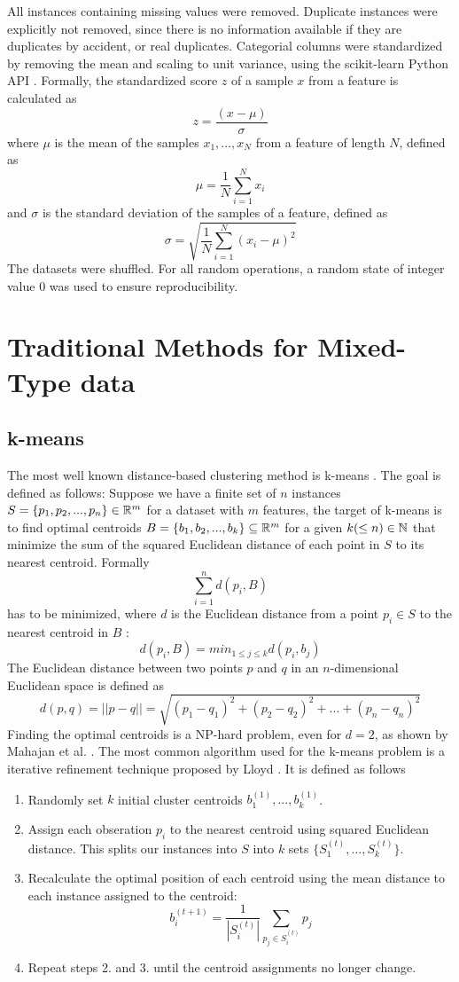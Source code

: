 All instances containing missing values were removed. Duplicate instances were explicitly not removed, since there is no information available if they are duplicates by accident, or real duplicates. Categorial columns were standardized by removing the mean and scaling to unit variance, using the scikit-learn Python API \cite{scikit_learn}. Formally, the standardized score $z$ of a sample $x$ from a feature is calculated as
$$z = \frac{(x-\mu)}{\sigma}$$
where $\mu$ is the mean of the samples $x_1, ...,x_N$ from a feature of length $N$, defined as
$$\mu = \frac{1}{N} \sum^{N}_{i=1} x_i$$
and $\sigma$ is the standard deviation of the samples of a feature, defined as
$$\sigma = \sqrt{\frac{1}{N} \sum^{N}_{i=1}(x_i - \mu)^2}$$
The datasets were shuffled. For all random operations, a random state of integer value 0 was used to ensure reproducibility.

\section{Traditional Methods for Mixed-Type data}

\subsection{k-means}

The most well known distance-based clustering method is k-means \cite{kmeans}. The goal is defined as follows: Suppose we have a finite set of $n$ instances $S=\{p_1, p_2, ..., p_n\} \in \mathbb{R}^m$ for a dataset with $m$ features, the target of k-means is to find optimal centroids $B=\{b_1, b_2, ..., b_k\} \subseteq \mathbb{R}^m$ for a given $k (\leq n) \in \mathbb{N}$ that minimize the sum of the squared Euclidean distance of each point in $S$ to its nearest centroid. Formally
$$\sum_{i=1}^n  d(p_i, B)$$
has to be minimized, where $d$ is the Euclidean distance from a point $p_i \in S$ to the nearest centroid in $B$ \cite{kmeans_np_hard}:
$$d(p_i, B) = min_{1 \leq j \leq k} d(p_i, b_j)$$
The Euclidean distance between two points $p$ and $q$ in an $n$-dimensional Euclidean space is defined as 
$$d(p, q) = || p - q || = \sqrt{(p_1 - q_1)^2 + (p_2 - q_2)^2 + ... + (p_n - q_n)^2}$$
Finding the optimal centroids is a NP-hard problem, even for $d=2$, as shown by Mahajan et al. \cite{kmeans_np_hard}. The most common algorithm used for the k-means problem is a iterative refinement technique proposed by Lloyd \cite{kmeans_lloyd}. It is defined as follows
\begin{enumerate} 
	\item Randomly set $k$ initial cluster centroids $b_1^{(1)}, ..., b_k^{(1)}$.
	\item Assign each obseration $p_i$ to the nearest centroid using squared Euclidean distance. This splits our instances into $S$ into $k$ sets $\{S_1^{(t)}, ..., S_k^{(t)}\}$.
	\item Recalculate the optimal position of each centroid using the mean distance to each instance assigned to the centroid: 
$$b_i^{(t+1)} = \frac{1}{|S_i^{(t)}|} \sum_{p_j \in S_i^{(t)}} p_j$$
	\item Repeat steps 2. and 3. until the centroid assignments no longer change.
\end{enumerate}


